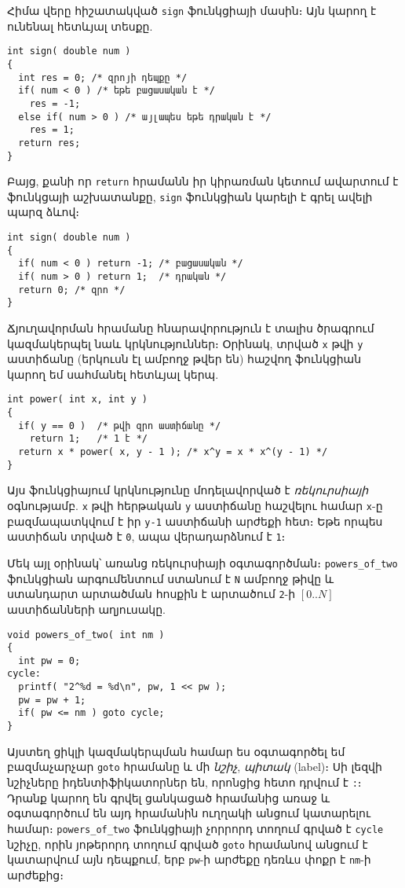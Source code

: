Հիմա վերը հիշատակված \texttt{sign} ֆունկցիայի մասին։ Այն կարող է ունենալ
հետևյալ տեսքը.

\begin{verbatim}
int sign( double num )
{
  int res = 0; /* զրոյի դեպքը */
  if( num < 0 ) /* եթե բացասական է */
    res = -1;
  else if( num > 0 ) /* այլապես եթե դրական է */
    res = 1;
  return res;
}
\end{verbatim}

Բայց, քանի որ \texttt{return} հրամանն իր կիրառման կետում ավարտում է ֆունկցայի
աշխատանքը, \texttt{sign} ֆունկցիան կարելի է գրել ավելի պարզ ձևով։

\begin{verbatim}
int sign( double num )
{
  if( num < 0 ) return -1; /* բացասական */
  if( num > 0 ) return 1;  /* դրական */
  return 0; /* զրո */
}
\end{verbatim}

Ճյուղավորման հրամանը հնարավորություն է տալիս ծրագրում կազմակերպել նաև
կրկնություններ։ Օրինակ, տրված \texttt{x} թվի \texttt{y} աստիճանը (երկուսն
էլ ամբողջ թվեր են) հաշվող ֆունկցիան կարող եմ սահմանել հետևյալ կերպ.

\begin{verbatim}
int power( int x, int y )
{
  if( y == 0 )  /* թվի զրո աստիճանը */
    return 1;   /* 1 է */
  return x * power( x, y - 1 ); /* x^y = x * x^(y - 1) */
}
\end{verbatim}

Այս ֆունկցիայում կրկնությունը մոդելավորված է \emph{ռեկուրսիայի} օգնությամբ.
\texttt{x} թվի հերթական \texttt{y} աստիճանը հաշվելու համար \texttt{x}-ը
բազմապատկվում է իր \texttt{y-1} աստիճանի արժեքի հետ։ Եթե որպես աստիճան տրված
է \texttt{0}, ապա վերադարձնում է \texttt{1}։

Մեկ այլ օրինակ՝ առանց ռեկուրսիայի օգտագործման։ \texttt{powers\_of\_two}
ֆունկցիան արգումենտում ստանում է \texttt{N} ամբողջ թիվը և ստանդարտ արտածման
հոսքին է արտածում \texttt{2}-ի \([0..N]\) աստիճանների աղյուսակը.

\begin{verbatim}
void powers_of_two( int nm )
{
  int pw = 0;
cycle:
  printf( "2^%d = %d\n", pw, 1 << pw );
  pw = pw + 1;
  if( pw <= nm ) goto cycle;
}
\end{verbatim}

Այստեղ ցիկլի կազմակերպման համար ես օգտագործել եմ բազմաչարչար \texttt{goto}
հրամանը և մի \emph{նշիչ}, \emph{պիտակ} (label)։ Սի լեզվի նշիչները
իդենտիֆիկատորներ են, որոնցից հետո դրվում է \verb|:|։ Դրանք կարող են գրվել
ցանկացած հրամանից առաջ և օգտագործում են այդ հրամանին ուղղակի անցում
կատարելու համար։ \texttt{powers\_of\_two} ֆունկցիայի չորրորդ տողում գրված
է \texttt{cycle} նշիչը, որին յոթերորդ տողում գրված \texttt{goto} հրամանով
անցում է կատարվում այն դեպքում, երբ \texttt{pw}-ի արժեքը դեռևս փոքր է
\texttt{nm}-ի արժեքից։

